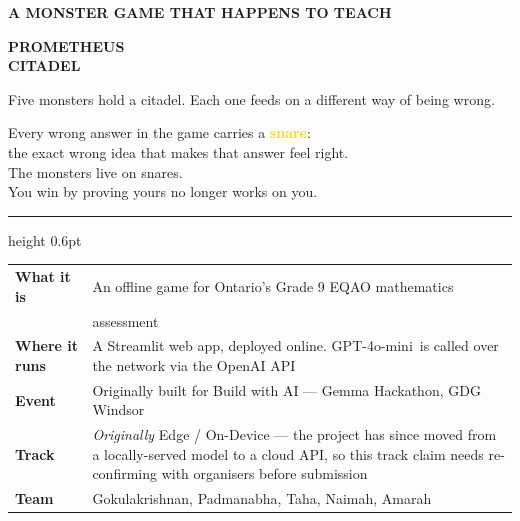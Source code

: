 \documentclass[11pt]{article}
\newcommand{\themodel}{GPT-4o-mini}
\newcommand{\snare}[1]{\textcolor{Gold}{\textbf{#1}}}
\begin{document}
\pagecolor{PageBG}
\color{Cream}

\begin{titlepage}
\thispagestyle{empty}
\vspace*{0.9cm}

{\sffamily\footnotesize\bfseries\color{Coral}A MONSTER GAME THAT HAPPENS TO TEACH\par}
\vspace{0.45cm}
{\sffamily\fontsize{44}{46}\selectfont\bfseries\color{Gold}PROMETHEUS\\CITADEL\par}
\vspace{0.55cm}
{\Large\color{Cream}Five monsters hold a citadel. Each one feeds on a
different way of being wrong.\par}

\vspace{1.1cm}
\begin{snarebox}
\centering\large
Every wrong answer in the game carries a \snare{snare}:\\[0.3em]
the exact wrong idea that makes that answer feel right.\\[0.55em]
The monsters live on snares.\\[0.3em]
You win by proving yours no longer works on you.
\end{snarebox}

\vspace{0.9cm}
{\color{Muted}\hrule height 0.6pt}
\vspace{0.7cm}

\begin{tabularx}{\textwidth}{@{}>{\sffamily\bfseries\color{Coral}}l X@{}}
What it is & An offline game for Ontario's Grade 9 EQAO mathematics\\
           & assessment\\[0.4em]
Where it runs & A Streamlit web app, deployed online. \themodel\ is called
               over the network via the OpenAI API\\[0.4em]
Event & Originally built for Build with AI --- Gemma Hackathon, GDG Windsor\\[0.4em]
Track & \emph{Originally} Edge / On-Device --- the project has since moved
        from a locally-served model to a cloud API, so this track claim
        needs re-confirming with organisers before submission\\[0.4em]
Team & Gokulakrishnan, Padmanabha, Taha, Naimah, Amarah\\
\end{tabularx}


\end{titlepage}
\end{document}
